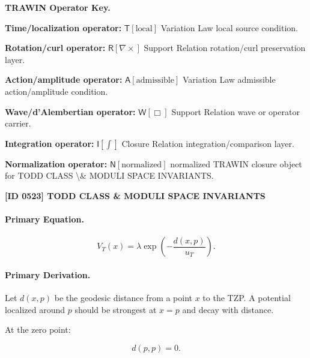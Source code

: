 \par\vspace{0.45\baselineskip}
\noindent\begin{minipage}[t]{\linewidth}
\begingroup
\small
\raggedright
\textbf{TRAWIN Operator Key.}\par
\noindent\textbf{Time/localization operator:} $\mathsf{T}\!\left[\mathrm{local}\right]$ Variation Law local source condition.\par
\noindent\textbf{Rotation/curl operator:} $\mathsf{R}\!\left[\nabla\times\right]$ Support Relation rotation/curl preservation layer.\par
\noindent\textbf{Action/amplitude operator:} $\mathsf{A}\!\left[\mathrm{admissible}\right]$ Variation Law admissible action/amplitude condition.\par
\noindent\textbf{Wave/d'Alembertian operator:} $\mathsf{W}\!\left[\Box\right]$ Support Relation wave or operator carrier.\par
\noindent\textbf{Integration operator:} $\mathsf{I}\!\left[\int\right]$ Closure Relation integration/comparison layer.\par
\noindent\textbf{Normalization operator:} $\mathsf{N}\!\left[\mathrm{normalized}\right]$ normalized TRAWIN closure object for TODD CLASS \textbackslash{}\& MODULI SPACE INVARIANTS.\par
\endgroup
\end{minipage}

\clearpage
\noindent\textbf{[ID 0523] TODD CLASS \& MODULI SPACE INVARIANTS}\par
\vspace{0.35em}
\paragraph{Primary Equation.}
\begin{equation}
V_T(x)
=
\lambda
\exp\left(
-\frac{d(x,p)}{u_T}
\right).
\end{equation}

\paragraph{Primary Derivation.}
Let $d(x,p)$ be the geodesic distance from a point $x$ to the TZP.  
A potential localized around $p$ should be strongest at $x=p$ and decay with distance.

At the zero point:

\begin{equation}
d(p,p)=0 .
\end{equation}

